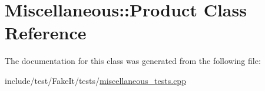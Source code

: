 \hypertarget{classMiscellaneous_1_1Product}{}\section{Miscellaneous\+::Product Class Reference}
\label{classMiscellaneous_1_1Product}


The documentation for this class was generated from the following file\+:\begin{DoxyCompactItemize}
\item 
include/test/\+Fake\+It/tests/\mbox{\hyperlink{miscellaneous__tests_8cpp}{miscellaneous\+\_\+tests.\+cpp}}\end{DoxyCompactItemize}
